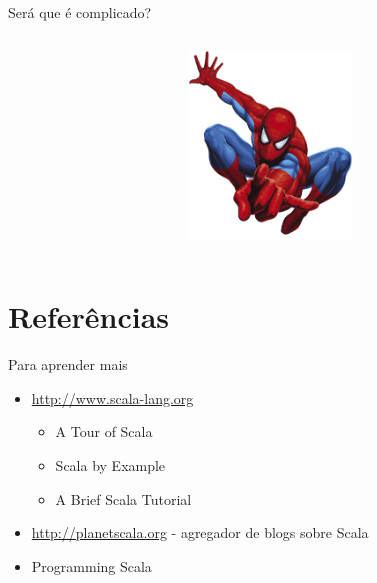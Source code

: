 \documentclass{beamer}
\begin{document}
\begin{frame}{Será que é complicado?}
	\begin{columns}
           \begin{column}{.5\textwidth}               
           \end{column}
           \begin{column}{.5\textwidth}
               \includegraphics[height=5cm]{spiderman.png}
           \end{column}
	\end{columns}	
\end{frame}

\section{Referências}

\begin{frame}{Para aprender mais}
	\begin{itemize} 
	\item \url{http://www.scala-lang.org}
		\begin{itemize} 
			\item A Tour of Scala
			\item Scala by Example
			\item A Brief Scala Tutorial
		\end{itemize}
	\item \url{http://planetscala.org} - agregador de blogs sobre Scala
	\item Programming Scala 
	\end{itemize}
\end{frame}
\end{document}
